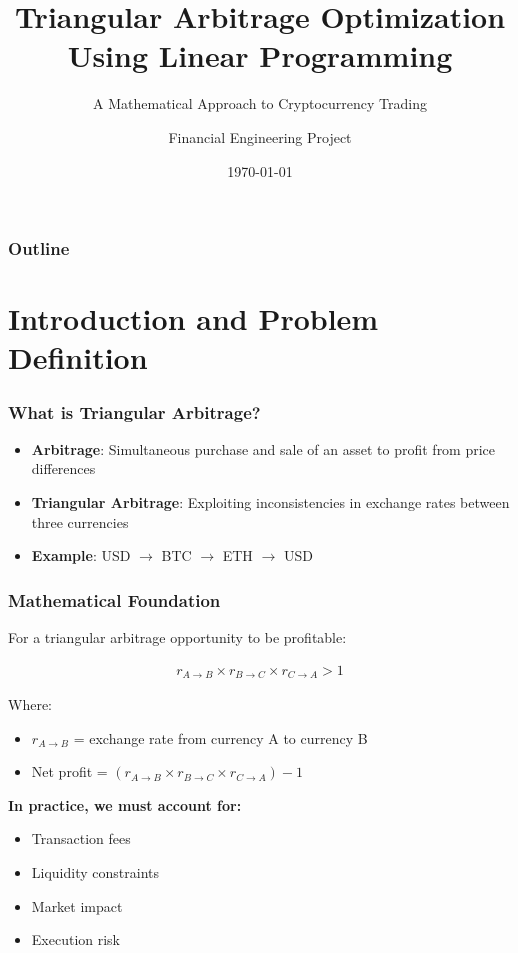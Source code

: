 \documentclass{beamer}
\title[Triangular Arbitrage Optimization]{Triangular Arbitrage Optimization Using Linear Programming}
\subtitle{A Mathematical Approach to Cryptocurrency Trading}
\author{Financial Engineering Project}
\institute{University Course - Optimization Methods}
\date{\today}
\begin{document}
\frame{\titlepage}

\begin{frame}
\frametitle{Outline}
\tableofcontents
\end{frame}

\section{Introduction and Problem Definition}

\begin{frame}
\frametitle{What is Triangular Arbitrage?}
\begin{itemize}
    \item \textbf{Arbitrage}: Simultaneous purchase and sale of an asset to profit from price differences
    \item \textbf{Triangular Arbitrage}: Exploiting inconsistencies in exchange rates between three currencies
    \item \textbf{Example}: USD $\rightarrow$ BTC $\rightarrow$ ETH $\rightarrow$ USD
\end{itemize}

\vspace{0.5cm}


\end{frame}

\begin{frame}
\frametitle{Mathematical Foundation}
For a triangular arbitrage opportunity to be profitable:

\begin{align}
r_{A \rightarrow B} \times r_{B \rightarrow C} \times r_{C \rightarrow A} > 1
\end{align}

Where:
\begin{itemize}
    \item $r_{A \rightarrow B}$ = exchange rate from currency A to currency B
    \item Net profit = $(r_{A \rightarrow B} \times r_{B \rightarrow C} \times r_{C \rightarrow A}) - 1$
\end{itemize}

\vspace{0.5cm}

\textbf{In practice, we must account for:}
\begin{itemize}
    \item Transaction fees
    \item Liquidity constraints
    \item Market impact
    \item Execution risk
\end{itemize}
\end{frame}
\end{document}
